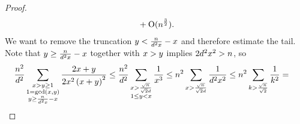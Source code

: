 \begin{proof}
\begin{align*}
{    %
      }
      +
      \BigO{\Size^{\frac32}}. 
    \end{align*}
    We want to remove the truncation
    $y < \frac{n_{}}{d^2x} - x$
    and therefore estimate the tail.
    Note that
    $y\geq\frac{n_{}}{d^2x} - x$
    together with $x>y$ implies
    $2d^2x^2>n_{}$, %
    so
    \begin{align*}
      \frac{\Size^2}{\TheDivisor^2}
      \Sum[\substack{
      \LeftA>\RightA\geq 1 \\
      1 = \gcdOf{\LeftA,\RightA} \\
      \RightA \geq \frac{\Size}{\TheDivisor^2\LeftA} - \LeftA
      }]{
      \frac{2\LeftA+\RightA}{2\LeftA^2\Parens{\LeftA+\RightA}^2}   
      }
      &
        \leq
        \frac{\Size^2}{\TheDivisor^2}
        \Sum[\substack{
        \LeftA>\frac{\SqrtOf{\Size}}{\SqrtOf{2}\TheDivisor}\\
      1 \leq \RightA <\LeftA
      }]{
      \frac{1}{\LeftA^3}
      }
        \leq
        \Size^2
        \Sum[\substack{
        \LeftA>\frac{\SqrtOf{\Size}}{\SqrtOf{2}\TheDivisor}\\
      }]{
      \frac{1}{\TheDivisor^2\LeftA^2}
      }
         \leq
         \Size^2
         \Sum[\substack{
         \AltIndex>\frac{\SqrtOf{\Size}}{\SqrtOf{2}}\\
      }]{
      \frac{1}{\AltIndex^2}
      }
        =

\end{align*}
\end{proof}
